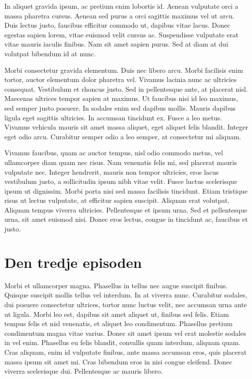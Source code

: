 \documentclass[a4paper,10pt]{article}
\begin{document}
In aliquet gravida ipsum, ac pretium enim lobortis id. Aenean vulputate orci a massa pharetra cursus. Aenean sed purus a orci sagittis maximus vel ut arcu. Duis lectus justo, faucibus efficitur commodo ut, dapibus vitae lacus. Donec egestas sapien lorem, vitae euismod velit cursus ac. Suspendisse vulputate erat vitae mauris iaculis finibus. Nam sit amet sapien purus. Sed at diam at dui volutpat bibendum id at nunc.

Morbi consectetur gravida elementum. Duis nec libero arcu. Morbi facilisis enim tortor, auctor elementum dolor pharetra vel. Vivamus lacinia nunc ac ultricies consequat. Vestibulum et rhoncus justo. Sed in pellentesque ante, at placerat nisl. Maecenas ultrices tempor sapien at maximus. Ut faucibus nisi id leo maximus, sed semper justo posuere. In sodales enim sed dapibus mollis. Mauris dapibus ligula eget sagittis ultricies. In accumsan tincidunt ex. Fusce a leo metus. Vivamus vehicula mauris sit amet massa aliquet, eget aliquet felis blandit. Integer eget odio arcu. Curabitur semper odio a leo semper, at consectetur mi aliquam.

Vivamus faucibus, quam ac auctor tempus, nisl odio commodo metus, vel ullamcorper diam quam nec risus. Nam venenatis felis mi, sed placerat mauris vulputate nec. Integer hendrerit, mauris non tempor ultricies, eros lacus vestibulum justo, a sollicitudin ipsum nibh vitae velit. Fusce luctus scelerisque ipsum ut dignissim. Morbi porta nisi sed massa facilisis tincidunt. Etiam tristique risus ut lectus vulputate, at efficitur sapien suscipit. Aliquam erat volutpat. Aliquam tempus viverra ultricies. Pellentesque et ipsum urna. Sed et pellentesque urna, sit amet euismod nisi. Donec eros lectus, congue in tincidunt ac, faucibus et justo.
\section{Den tredje episoden}
Morbi et ullamcorper magna. Phasellus in tellus nec augue suscipit finibus. Quisque suscipit mollis tellus vel interdum. In at viverra nunc. Curabitur sodales, dui posuere consectetur ultrices, tortor nunc luctus velit, nec accumsan urna ante ut ligula. Morbi leo est, dapibus sit amet aliquet ut, finibus sed felis. Etiam tempus felis et nisl venenatis, et aliquet leo condimentum. Phasellus pretium condimentum magna vitae varius. Donec sit amet ipsum vel erat molestie sodales in vel enim. Phasellus eu felis blandit, convallis quam interdum, aliquam quam. Cras aliquam, enim id vulputate finibus, ante massa accumsan eros, quis placerat massa ipsum sit amet mi. Cras bibendum eros in nisi congue eleifend. Donec viverra scelerisque dui. Pellentesque ac mauris libero.
\end{document}
